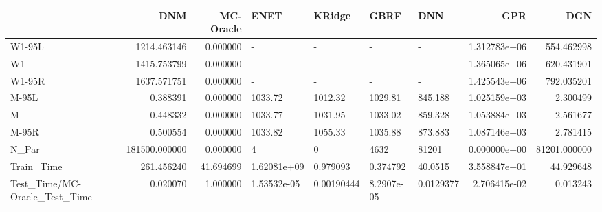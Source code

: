 \begin{tabular}{lrrllllrr}
\toprule
{} &            DNM &  MC-Oracle &         ENET &      KRidge &        GBRF &        DNN &           GPR &           DGN \\
\midrule
W1-95L                        &    1214.463146 &   0.000000 &            - &           - &           - &          - &  1.312783e+06 &    554.462998 \\
W1                            &    1415.753799 &   0.000000 &            - &           - &           - &          - &  1.365065e+06 &    620.431901 \\
W1-95R                        &    1637.571751 &   0.000000 &            - &           - &           - &          - &  1.425543e+06 &    792.035201 \\
M-95L                         &       0.388391 &   0.000000 &      1033.72 &     1012.32 &     1029.81 &    845.188 &  1.025159e+03 &      2.300499 \\
M                             &       0.448332 &   0.000000 &      1033.77 &     1031.95 &     1033.02 &    859.328 &  1.053884e+03 &      2.561677 \\
M-95R                         &       0.500554 &   0.000000 &      1033.82 &     1055.33 &     1035.88 &    873.883 &  1.087146e+03 &      2.781415 \\
N\_Par                         &  181500.000000 &   0.000000 &            4 &           0 &        4632 &      81201 &  0.000000e+00 &  81201.000000 \\
Train\_Time                    &     261.456240 &  41.694699 &  1.62081e+09 &    0.979093 &    0.374792 &    40.0515 &  3.558847e+01 &     44.929648 \\
Test\_Time/MC-Oracle\_Test\_Time &       0.020070 &   1.000000 &  1.53532e-05 &  0.00190444 &  8.2907e-05 &  0.0129377 &  2.706415e-02 &      0.013243 \\
\bottomrule
\end{tabular}
